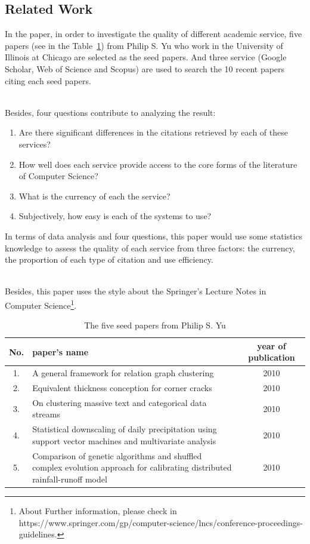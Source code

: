 \documentclass[runningheads]{llncs}
\begin{document}
\subsection{Related Work}
In the paper, in order to investigate the quality of different academic service, five papers (see in the Table~\ref{tab:my_label}) from Philip S. Yu who work in the University of Illinois at Chicago are selected as the seed papers. And three service (Google Scholar, Web of Science and Scopus) are used to search the 10 recent papers citing each seed papers. 
\par\noindent\\
Besides, four questions contribute to analyzing the result:
\begin{enumerate}
    \item Are there significant differences in the citations retrieved by each of these services?
    \item How well does each service provide access to the core forms of the literature of Computer Science?        
    \item What is the currency of each the service?
    \item Subjectively, how easy is each of the systems to use?
\end{enumerate}
In terms of data analysis and four questions, this paper would use some statistics knowledge to assess the quality of each service from three factors: the currency, the proportion of each type of citation and use efficiency.
\par\noindent\\
Besides, this paper uses the style about the Springer's Lecture Notes in Computer Science\footnote{About Further information, please check in  https://www.springer.com/gp/computer-science/lncs/conference-proceedings-guidelines.}.
\begin{table}[ht]
    \setlength{\abovecaptionskip}{10pt}%
    \setlength{\belowcaptionskip}{0pt}%
    \caption{The five seed papers from Philip S. Yu}
    \centering
    \begin{tabular}{|c|p{}|c|}
    \hline
        No. & paper's name & year of publication  \\
    \hline
         1. & A general framework for relation graph clustering & 2010 \\
   
         2. & Equivalent thickness conception for corner cracks & 2010\\
    
         3. & On clustering massive text and categorical data streams & 2010\\
    
         4. & Statistical downscaling of daily precipitation using support vector machines and multivariate analysis & 2010\\
   
         5. & Comparison of genetic algorithms and shuffled complex evolution approach for calibrating distributed rainfall-runoff model & 2010 \\ 
    \hline
    \end{tabular}
    
    \label{tab:my_label}
\end{table}
\end{document}

